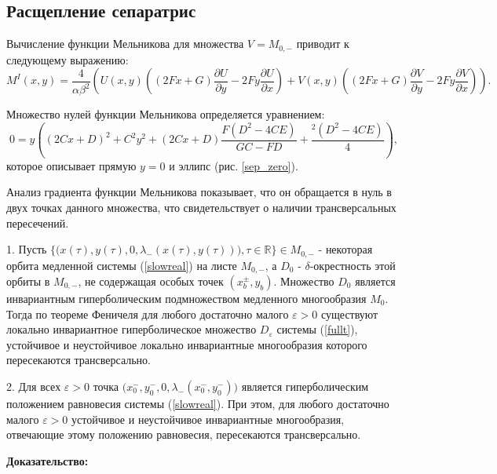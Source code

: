 \subsection{Расщепление сепаратрис}

Вычисление функции Мельникова для множества $V = M_{0,-}$ приводит к следующему выражению:
\begin{equation}
M^I(x,y) = \frac{4}{\alpha \beta^2} \left( 
U(x,y) \left( (2Fx +  G)\frac{\partial U}{\partial y} - 2Fy \frac{\partial U}{\partial x} \right) + 
V(x,y) \left((2Fx +  G)\frac{\partial V}{\partial y} - 2Fy \frac{\partial V}{\partial x} \right)
\right).
\end{equation}

Множество нулей функции Мельникова определяется уравнением:
\begin{equation}
0 = y \left( 
(2Cx +  D)^2 + C^2 y^2 + (2Cx +  D)\frac{F(D^2-4CE)}{GC-FD} + \frac{^2 (D^2-4CE)}{4}
\right),
\end{equation}
которое описывает прямую $y = 0$ и эллипс (рис. \ref{sep_zero}).

Анализ градиента функции Мельникова показывает, что он обращается в нуль в двух точках данного множества, что свидетельствует о наличии трансверсальных пересечений.







\begin{thm}


1. Пусть $\Big\{\big( x(\tau), y(\tau), 0, \lambda_{-} (x(\tau), y(\tau)) \big), \tau\in \mathbb{R} \Big\} \in M_{0,-}$ - некоторая орбита медленной системы (\ref{slowreal}) на листе $M_{0,-}$, 
а $D_0$ -  $\delta$-окрестность этой орбиты в $M_{0,-}$, не содержащая особых точек $(x_{b}^{\pm}, y_{b})$. Множество $D_0$ является инвариантным гиперболическим подмножеством медленного многообразия $M_0$. Тогда по теореме Феничеля для любого достаточно малого $\varepsilon > 0$ существуют локально инвариантное гиперболическое множество $D_\varepsilon$ системы (\ref{fullt}), устойчивое и неустойчивое локально инвариантные многообразия которого пересекаются трансверсально.

2. Для всех $\varepsilon>0$ точка $\big( x_{0}^{-}, y_{0}^{-}, 0, \lambda_{-}(x_{0}^{-}, y_{0}^{-}) \big)$ является гиперболическим положением равновесия системы (\ref{slowreal}).
При этом, для любого достаточно малого $\varepsilon > 0$ устойчивое и неустойчивое инвариантные многообразия, отвечающие этому положению равновесия, пересекаются трансверсально.
\end{thm}
\textbf{Доказательство:}

